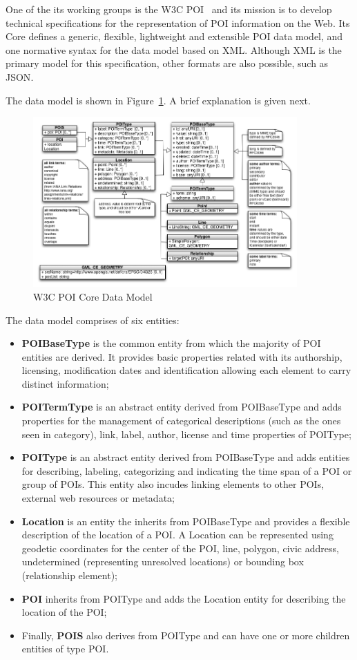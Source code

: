 \documentclass[times]{ettauth}
\begin{document}
One of the its working groups is the \ac{W3C} POI~\cite{w3c-poi} and its mission is to develop technical specifications for the representation of \ac{POI} information on the Web. Its Core defines a generic, flexible, lightweight and extensible \ac{POI} data model, and one normative syntax for the data model based on \acf{XML}. Although \ac{XML} is the primary model for this specification, other formats are also possible, such as \acf{JSON}.

The data model is shown in Figure~\ref{fig:data-model}. A brief explanation is given next.

\begin{figure}[!ht]
\centering
\includegraphics[width=0.9\textwidth]{images/uml}
\caption{W3C POI Core Data Model}
\label{fig:data-model}
\end{figure}

The data model comprises of six entities:
\begin{itemize}
\item \textbf{POIBaseType} is the common entity from which the majority of POI entities are derived. It provides basic properties related with its authorship, licensing, modification dates and identification allowing each element to carry distinct information;
\item \textbf{POITermType} is an abstract entity derived from POIBaseType and adds properties for the management of categorical descriptions (such as the ones seen in category), link, label, author, license and time properties of POIType;
\item \textbf{POIType} is an abstract entity derived from POIBaseType and adds entities for describing, labeling, categorizing and indicating the time span of a POI or group of POIs. This entity also incudes linking elements to other POIs, external web resources or metadata;
\item \textbf{Location} is an entity the inherits from POIBaseType and provides a flexible description of the location of a POI. A Location can be represented using geodetic coordinates for the center of the POI, line, polygon, civic address,  undetermined (representing unresolved locations) or bounding box (relationship element);
\item \textbf{POI} inherits from POIType and adds the Location entity for describing the location of the POI;
\item Finally, \textbf{POIS} also derives from POIType and can have one or more children entities of type POI.
\end{itemize}
\end{document}
